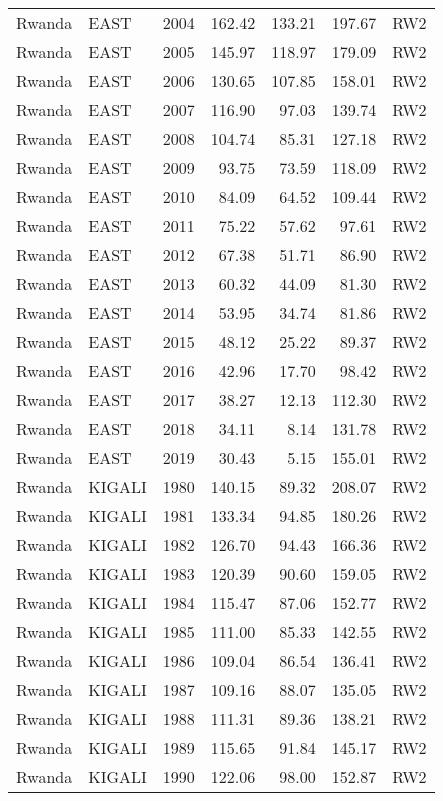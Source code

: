 \begin{longtable}{lllrrrl}
  Rwanda & EAST & 2004 & 162.42 & 133.21 & 197.67 & RW2 \\ 
  Rwanda & EAST & 2005 & 145.97 & 118.97 & 179.09 & RW2 \\ 
  Rwanda & EAST & 2006 & 130.65 & 107.85 & 158.01 & RW2 \\ 
  Rwanda & EAST & 2007 & 116.90 & 97.03 & 139.74 & RW2 \\ 
  Rwanda & EAST & 2008 & 104.74 & 85.31 & 127.18 & RW2 \\ 
  Rwanda & EAST & 2009 & 93.75 & 73.59 & 118.09 & RW2 \\ 
  Rwanda & EAST & 2010 & 84.09 & 64.52 & 109.44 & RW2 \\ 
  Rwanda & EAST & 2011 & 75.22 & 57.62 & 97.61 & RW2 \\ 
  Rwanda & EAST & 2012 & 67.38 & 51.71 & 86.90 & RW2 \\ 
  Rwanda & EAST & 2013 & 60.32 & 44.09 & 81.30 & RW2 \\ 
  Rwanda & EAST & 2014 & 53.95 & 34.74 & 81.86 & RW2 \\ 
  Rwanda & EAST & 2015 & 48.12 & 25.22 & 89.37 & RW2 \\ 
  Rwanda & EAST & 2016 & 42.96 & 17.70 & 98.42 & RW2 \\ 
  Rwanda & EAST & 2017 & 38.27 & 12.13 & 112.30 & RW2 \\ 
  Rwanda & EAST & 2018 & 34.11 & 8.14 & 131.78 & RW2 \\ 
  Rwanda & EAST & 2019 & 30.43 & 5.15 & 155.01 & RW2 \\ 
  Rwanda & KIGALI & 1980 & 140.15 & 89.32 & 208.07 & RW2 \\ 
  Rwanda & KIGALI & 1981 & 133.34 & 94.85 & 180.26 & RW2 \\ 
  Rwanda & KIGALI & 1982 & 126.70 & 94.43 & 166.36 & RW2 \\ 
  Rwanda & KIGALI & 1983 & 120.39 & 90.60 & 159.05 & RW2 \\ 
  Rwanda & KIGALI & 1984 & 115.47 & 87.06 & 152.77 & RW2 \\ 
  Rwanda & KIGALI & 1985 & 111.00 & 85.33 & 142.55 & RW2 \\ 
  Rwanda & KIGALI & 1986 & 109.04 & 86.54 & 136.41 & RW2 \\ 
  Rwanda & KIGALI & 1987 & 109.16 & 88.07 & 135.05 & RW2 \\ 
  Rwanda & KIGALI & 1988 & 111.31 & 89.36 & 138.21 & RW2 \\ 
  Rwanda & KIGALI & 1989 & 115.65 & 91.84 & 145.17 & RW2 \\ 
  Rwanda & KIGALI & 1990 & 122.06 & 98.00 & 152.87 & RW2 \\ 

\end{longtable}
